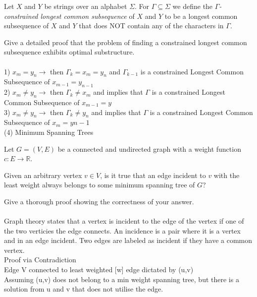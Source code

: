 \documentclass[11pt]{amsart}
\begin{document}
Let $X$ and $Y$ be strings over an alphabet $\Sigma$. For $\Gamma\subseteq \Sigma$ we define the \emph{$\Gamma$-constrained longest common subsequence } of $X$ and $Y$ to be a longest common subsequence of $X$ and $Y$ that does NOT 
contain any of the characters in $\Gamma$.\medskip

Give a detailed proof that the problem of finding a constrained longest common subsequence exhibits optimal substructure.\\\\
1) $x_m = y_n \rightarrow$ then $\Gamma_k = x_m = y_n$ and $\Gamma_{k-1}$ is a constrained Longest Common Subsequence of $x_{m-1} = y_{n-1}$
\\
2) $x_m \neq y_n \rightarrow$ then $\Gamma_k \neq x_m$ and implies that $\Gamma$ is a constrained Longest Common Subsequence of $x_{m-1} = y$
\\
3) $x_m \neq y_n \rightarrow$ then $\Gamma_k \neq y_n$ and implies that $\Gamma$ is a constrained Longest Common Subsequence of $x_m = y{n-1}$
\\
\newpage
(4) Minimum Spanning Trees\medskip

Let $G=(V,E)$ be a connected and undirected graph with a weight function $c\colon E \to \mathbb{R}$. \medskip

Given an arbitrary vertex $v\in V$, is it true that an edge incident to $v$ with the least weight always belongs to some minimum spanning tree of $G$?\medskip

Give a thorough proof showing the correctness of your answer. 
\\\\
Graph theory states that a vertex is incident to the edge of the vertex if one of the two verticies the edge connects. An incidence is a pair where it is a vertex and in an edge incident. Two edges are labeled as incident if they have a common vertex.\\Proof via Contradiction\\Edge V connected to least weighted [w] edge dictated by (u,v)\\Assuming (u,v) does not belong to a min weight spanning tree, but there is a solution from u and v that does not utilise the edge. 
\end{document}
